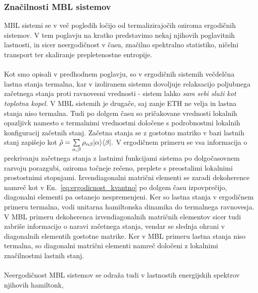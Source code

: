 \documentclass[10pt,a4paper]{article}
\begin{document}
\subsubsection{Značilnosti MBL sistemov } 
MBL sistemi se v več pogledih ločijo od termalizirajočih oziroma ergodičnih sistemov. V tem poglavju na kratko predstavimo nekaj njihovih poglavitnih lastnosti, in sicer neergodičnost v času, značilno spektralno statistiko, ničelni transport ter skaliranje prepletenostne entropije. \\\\	
Kot smo opisali v predhodnem poglavju, so v ergodičnih sistemih večdelčna lastna stanja termalna, kar v izoliranem sistemu dovoljuje relaksacijo poljubnega začetnega stanja proti ravnovesni vrednosti - sistem lahko \emph{sam sebi služi kot toplotna kopel}. V MBL sistemih je drugače, saj zanje ETH ne velja in lastna stanja niso termalna. Tudi po dolgem času so pričakovane vrednosti lokalnih opazljivk namesto s termalnimi vrednostmi določene s podrobnostmi lokalnih konfiguracij začetnih stanj. Začetna stanja se z gostotno matriko v bazi lastnih stanj zapišejo kot $\hat{\rho}=\sum\limits_{\alpha,\beta}\rho_{\alpha\beta}\vert\alpha\rangle\langle \beta \vert.$ V ergodičnem primeru se vsa informacija o prekrivanju začetnega stanja z lastnimi funkcijami sistema po dolgočasovnem razvoju porazgubi, oziroma točneje rečeno, preplete s preostalimi lokalnimi prostostnimi stopnjami. Izvendiagonalni matrični elementi se zaradi dekoherence namreč kot v En.~\eqref{eq:ergodicnost_kvantno} po dolgem času izpovprečijo, diagonalni elementi pa ostanejo nespremenjeni. Ker so lastna stanja v ergodičnem primeru termalna, vodi unitarna hamiltonska dinamika do termalnega ravnovesja. V MBL primeru dekoherenca izvendiagonalnih matričnih elementov sicer tudi zabriše informacijo o naravi začetnega stanja, 
vendar se slednja ohrani v diagonalnih elementih gostotne matrike. Ker v MBL primeru lastna stanja niso termalna, so diagonalni matrični elementi namreč določeni z lokalnimi značilnostmi lastnih stanj.\\\\
Neergodičnost MBL sistemov se odraža tudi v lastnostih energijskih spektrov njihovih hamiltonk, 
\end{document}
